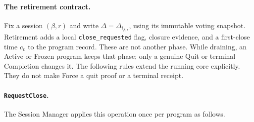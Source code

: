 \paragraph{The retirement contract.}
\label{sec:retirement}
Fix a session $(\beta,r)$ and write $\Delta=\Delta_{i_{\beta,r}}$,
using its immutable voting snapshot. Retirement adds a local
\texttt{close\_requested} flag, closure evidence, and a first-close time
$c_v$ to the program record. These are not another phase. While draining,
an Active or Frozen program keeps that phase; only a genuine Quit or
terminal Completion changes it. The following rules extend the running
core explicitly. They do not make Force a quit proof or a terminal receipt.

\paragraph{\texttt{RequestClose}.}
The Session Manager applies this operation once per program as follows.
